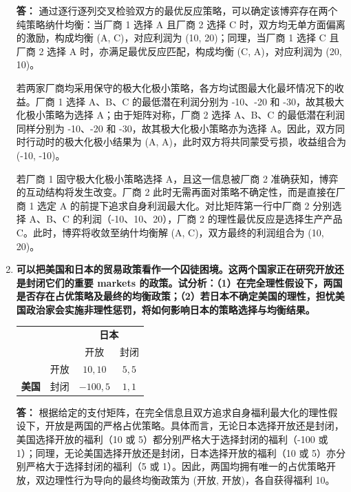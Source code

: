 \begin{enumerate}[label=\textbf{\arabic*.}, leftmargin=*]
		\textbf{答：}
		通过逐行逐列交叉检验双方的最优反应策略，可以确定该博弈存在两个纯策略纳什均衡：当厂商 1 选择 A 且厂商 2 选择 C 时，双方均无单方面偏离的激励，构成均衡 (A, C)，对应利润为 (10, 20)；同理，当厂商 1 选择 C 且厂商 2 选择 A 时，亦满足最优反应匹配，构成均衡 (C, A)，对应利润为 (20, 10)。
		
		若两家厂商均采用保守的极大化极小策略，各方均试图最大化最坏情况下的收益。厂商 1 选择 A、B、C 的最低潜在利润分别为 -10、-20 和 -30，故其极大化极小策略为选择 A；由于矩阵对称，厂商 2 选择 A、B、C 的最低潜在利润同样分别为 -10、-20 和 -30，故其极大化极小策略亦为选择 A。因此，双方同时行动时的极大化极小结果为 (A, A)，此时双方将共同蒙受亏损，收益组合为 (-10, -10)。
		
		若厂商 1 固守极大化极小策略选择 A，且这一信息被厂商 2 准确获知，博弈的互动结构将发生改变。厂商 2 此时无需再面对策略不确定性，而是直接在厂商 1 选定 A 的前提下追求自身利润最大化。对比矩阵第一行中厂商 2 分别选择 A、B、C 的利润（-10、10、20），厂商 2 的理性最优反应是选择生产产品 C。此时，博弈将收敛至纳什均衡解 (A, C)，双方最终的利润组合为 (10, 20)。
		
		\item \textbf{可以把美国和日本的贸易政策看作一个囚徒困境。这两个国家正在研究开放还是封闭它们的重要 markets 的政策。试分析：（1）在完全理性假设下，两国是否存在占优策略及最终的均衡政策；（2）若日本不确定美国的理性，担忧美国政治家会实施非理性惩罚，将如何影响日本的策略选择与均衡结果。}
		
		\begin{center}
			\small
			\renewcommand{\arraystretch}{1.3}
			\setlength{\tabcolsep}{4pt}
			\begin{tabular}{cc|c|c|}
				\multicolumn{2}{c}{} & \multicolumn{2}{c}{\textbf{日本}} \\
				\multicolumn{2}{c}{} & \multicolumn{1}{c}{开放} & \multicolumn{1}{c}{封闭} \\
				\cline{3-4}
				& 开放 & $10, 10$ & $5, 5$ \\
				\cline{3-4}
				\textbf{美国} & 封闭 & $-100, 5$ & $1, 1$ \\
				\cline{3-4}
			\end{tabular}
		\end{center}
		
		\textbf{答：}
		根据给定的支付矩阵，在完全信息且双方追求自身福利最大化的理性假设下，开放是两国的严格占优策略。具体而言，无论日本选择开放还是封闭，美国选择开放的福利（10 或 5）都分别严格大于选择封闭的福利（-100 或 1）；同理，无论美国选择开放还是封闭，日本选择开放的福利（10 或 5）亦分别严格大于选择封闭的福利（5 或 1）。因此，两国均拥有唯一的占优策略开放，双边理性行为导向的最终均衡政策为 (开放, 开放)，各自获得福利 10。
		

\end{enumerate}
